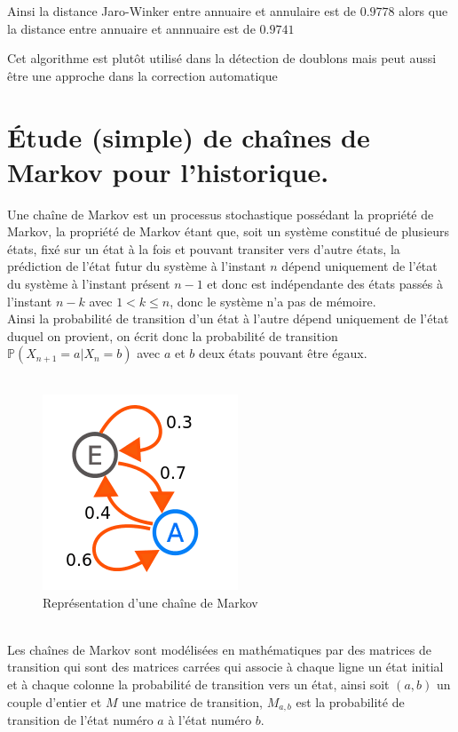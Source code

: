 \documentclass[final, 10pt]{report}
\begin{document}
    Ainsi la distance Jaro-Winker entre \fg annuaire\og{} et \fg annulaire\og{} est de $0.9778$ alors que la distance entre \fg annuaire\og{} et \fg annnuaire\og{} est de $0.9741$
    
    Cet algorithme est plutôt utilisé dans la détection de doublons mais peut aussi être une approche dans la correction automatique
    
\chapter{Étude (simple) de chaînes de Markov pour l’historique.}

Une chaîne de Markov est un processus stochastique possédant la propriété de Markov, la propriété de Markov étant que, soit un système constitué de plusieurs états, fixé sur un état à la fois et pouvant transiter vers d'autre états, la prédiction de l'état futur du système à l'instant $n$ dépend uniquement de l'état du système à l'instant présent $n-1$ et donc est indépendante des états passés à l'instant $n-k$ avec $1<k\leq n$, donc le système n'a pas de mémoire.\\
Ainsi la probabilité de transition d'un état à l'autre dépend uniquement de l'état duquel on provient, on écrit donc la probabilité de transition $\mathbb{P}(X_{n+1}=a | X_{n}=b)$ avec $a$ et $b$ deux états pouvant être égaux.\\
\\
\begin{figure}[!h]
    \centering
    \includegraphics[scale=0.5]{img/markovChaine.png}
    \caption{Représentation d'une chaîne de Markov}
    \label{fig:chaine_markov}
\end{figure}
\\
Les chaînes de Markov sont modélisées en mathématiques par des matrices de transition qui sont des matrices carrées qui associe à chaque ligne un état initial et à chaque colonne la probabilité de transition vers un état, ainsi soit $(a,b)$ un couple d'entier et $M$ une matrice de transition, $M_{a,b}$ est la probabilité de transition de l'état numéro $a$ à l'état numéro $b$.\\
\end{document}
